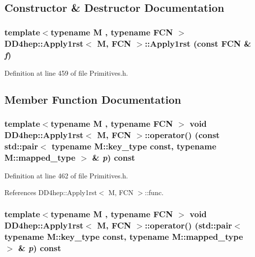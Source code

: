 \subsection{Constructor \& Destructor Documentation}
\hypertarget{class_d_d4hep_1_1_apply1rst_ace36b3412daa02454436d3a43abd5e63}{
\subsubsection[{Apply1rst}]{\setlength{\rightskip}{0pt plus 5cm}template$<$typename M , typename FCN $>$ {\bf DD4hep::Apply1rst}$<$ M, FCN $>$::{\bf Apply1rst} (const FCN \& {\em f})}}
\label{class_d_d4hep_1_1_apply1rst_ace36b3412daa02454436d3a43abd5e63}


Definition at line 459 of file Primitives.h.

\subsection{Member Function Documentation}
\hypertarget{class_d_d4hep_1_1_apply1rst_a4d4ca3977250691bbbabfb6178880db2}{
\subsubsection[{operator()}]{\setlength{\rightskip}{0pt plus 5cm}template$<$typename M , typename FCN $>$ void {\bf DD4hep::Apply1rst}$<$ M, FCN $>$::operator() (const std::pair$<$ typename M::key\_\-type const, typename M::mapped\_\-type $>$ \& {\em p}) const}}
\label{class_d_d4hep_1_1_apply1rst_a4d4ca3977250691bbbabfb6178880db2}


Definition at line 462 of file Primitives.h.

References DD4hep::Apply1rst$<$ M, FCN $>$::func.\hypertarget{class_d_d4hep_1_1_apply1rst_a6da5fbe07b79ad9bbe704722b2bcfd5d}{
\subsubsection[{operator()}]{\setlength{\rightskip}{0pt plus 5cm}template$<$typename M , typename FCN $>$ void {\bf DD4hep::Apply1rst}$<$ M, FCN $>$::operator() (std::pair$<$ typename M::key\_\-type const, typename M::mapped\_\-type $>$ \& {\em p}) const}}
\label{class_d_d4hep_1_1_apply1rst_a6da5fbe07b79ad9bbe704722b2bcfd5d}


